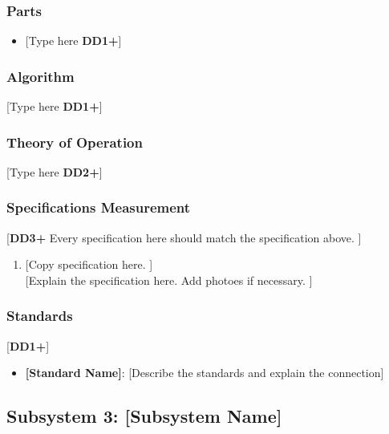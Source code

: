 \documentclass[letterpaper, 11pt]{article}
\begin{document}
\subsubsection{Parts}
\begin{itemize}
    \item {[Type here \textbf{DD1+}]}
\end{itemize}

\subsubsection{Algorithm}
[Type here \textbf{DD1+}]

\subsubsection{Theory of Operation}
[Type here \textbf{DD2+}]
\subsubsection{Specifications Measurement}
[\textbf{DD3+} Every specification here should match the specification above. ]
\begin{enumerate}
    \item {[Copy specification here. ]} \\
          {[Explain the specification here. Add photoes if necessary. ]}
\end{enumerate}

\subsubsection{Standards}
[\textbf{DD1+}]
\begin{itemize}
    \item \textbf{[Standard Name]}: [Describe the standards and explain the connection]
\end{itemize}

\clearpage
\subsection{Subsystem 3: [Subsystem Name]}

\end{document}
